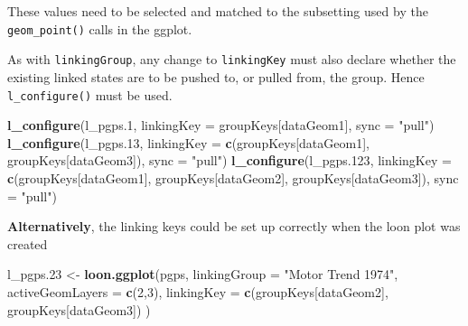 \documentclass[]{article}
\newenvironment{Shaded}{\begin{snugshade}}{\end{snugshade}}
\newcommand{\KeywordTok}[1]{\textcolor[rgb]{0.13,0.29,0.53}{\textbf{#1}}}
\newcommand{\DataTypeTok}[1]{\textcolor[rgb]{0.13,0.29,0.53}{#1}}
\newcommand{\DecValTok}[1]{\textcolor[rgb]{0.00,0.00,0.81}{#1}}
\newcommand{\StringTok}[1]{\textcolor[rgb]{0.31,0.60,0.02}{#1}}
\newcommand{\CommentTok}[1]{\textcolor[rgb]{0.56,0.35,0.01}{\textit{#1}}}
\newcommand{\OperatorTok}[1]{\textcolor[rgb]{0.81,0.36,0.00}{\textbf{#1}}}
\newcommand{\NormalTok}[1]{#1}
\begin{document}
These values need to be selected and matched to the subsetting used by
the \texttt{geom\_point()} calls in the ggplot.

\begin{Shaded}
\end{Shaded}

As with \texttt{linkingGroup}, any change to \texttt{linkingKey} must
also declare whether the existing linked states are to be pushed to, or
pulled from, the group. Hence \texttt{l\_configure()} must be used.

\begin{Shaded}
\begin{Highlighting}[]
\KeywordTok{l_configure}\NormalTok{(l_pgps.}\DecValTok{1}\NormalTok{, }
            \DataTypeTok{linkingKey =}\NormalTok{ groupKeys[dataGeom1], }
            \DataTypeTok{sync =} \StringTok{"pull"}\NormalTok{)}
\KeywordTok{l_configure}\NormalTok{(l_pgps.}\DecValTok{13}\NormalTok{, }
            \DataTypeTok{linkingKey =} \KeywordTok{c}\NormalTok{(groupKeys[dataGeom1],}
\NormalTok{                           groupKeys[dataGeom3]), }
            \DataTypeTok{sync =} \StringTok{"pull"}\NormalTok{)}
\KeywordTok{l_configure}\NormalTok{(l_pgps.}\DecValTok{123}\NormalTok{, }
            \DataTypeTok{linkingKey =} \KeywordTok{c}\NormalTok{(groupKeys[dataGeom1],}
\NormalTok{                           groupKeys[dataGeom2],}
\NormalTok{                           groupKeys[dataGeom3]), }
            \DataTypeTok{sync =} \StringTok{"pull"}\NormalTok{)}
\end{Highlighting}
\end{Shaded}

\textbf{Alternatively}, the linking keys could be set up correctly when
the loon plot was created

\begin{Shaded}
\begin{Highlighting}[]
\NormalTok{l_pgps.}\DecValTok{23}\NormalTok{ <-}\StringTok{ }\KeywordTok{loon.ggplot}\NormalTok{(pgps, }
                         \DataTypeTok{linkingGroup =} \StringTok{"Motor Trend 1974"}\NormalTok{,}
                         \DataTypeTok{activeGeomLayers =} \KeywordTok{c}\NormalTok{(}\DecValTok{2}\NormalTok{,}\DecValTok{3}\NormalTok{),}
                         \DataTypeTok{linkingKey =} \KeywordTok{c}\NormalTok{(groupKeys[dataGeom2],}
\NormalTok{                                        groupKeys[dataGeom3])}
\NormalTok{                         )}
\end{Highlighting}
\end{Shaded}
\end{document}
